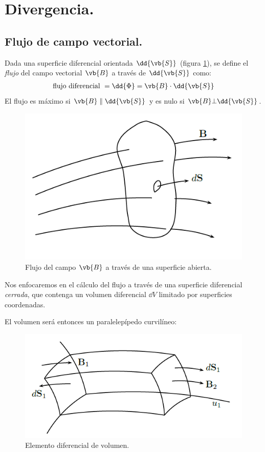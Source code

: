 \section{Divergencia.}
\subsection{Flujo de campo vectorial.}
Dada una superficie diferencial orientada $\dd{\vb{S}}$ (figura \ref{fig:figura_superficie_diferencial}), se define el \emph{flujo} del campo vectorial $\vb{B}$ a través de $\dd{\vb{S}}$ como:
\begin{align*}
\mbox{flujo diferencial } = \dd{\Phi} = \vb{B} \cdot \dd{\vb{S}}
\end{align*}
El flujo es máximo si $\vb{B} \parallel \dd{\vb{S}}$ y es nulo si $\vb{B} \bot \dd{\vb{S}}$.
\begin{figure}[H]
    \centering
    \includegraphics[scale=0.5]{Imagenes/Superficie_Diferencial.png}
    \caption{Flujo del campo $\vb{B}$ a través de una superficie abierta.}
    \label{fig:figura_superficie_diferencial}
\end{figure}
Nos enfocaremos en el cálculo del flujo a través de una superficie diferencial \emph{cerrada}, que contenga un volumen diferencial $\dd{V}$ limitado por superficies coordenadas.
\par
El volumen será entonces un paralelepípedo curvilíneo:
\begin{figure}[H]
    \centering
    \includegraphics[scale=0.5]{Imagenes/Diferencial_Volumen.png}
    \caption{Elemento diferencial de volumen.}
    \label{fig:Diferencial_Volumen}
\end{figure}
